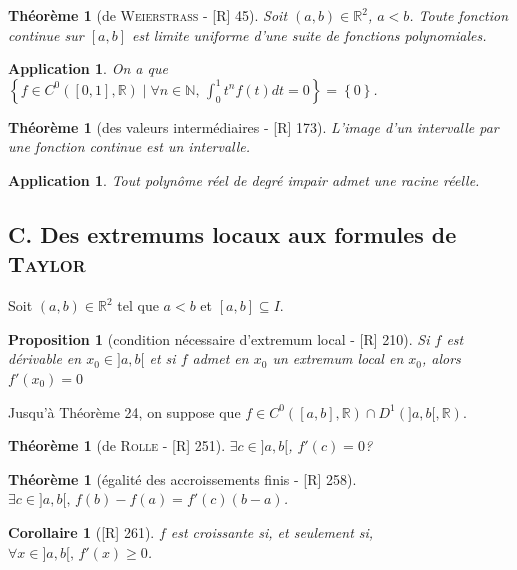 \documentclass[10pt, a4paper, parskip=full, twoside, twocolumn]{report}
\newtheorem{theorem}[definition]{Théorème}
\newtheorem{proposition}[definition]{Proposition}
\newtheorem{corollary}[definition]{Corollaire}
\newtheorem{application}[definition]{Application}
\newcommand{\IN}{\mathbb{N}}
\newcommand{\IR}{\mathbb{R}}
\begin{document}
\begin{theorem}[de \textsc{Weierstrass} - \textnormal{[R] 45}]
	Soit $(a,b)\in \IR^2$, $a<b$. Toute fonction continue sur $[a,b]$ est limite uniforme d'une suite de fonctions polynomiales.
\end{theorem}

\begin{application}
	On a que $\left\{f\in C^0([0,1],\IR)\mid \forall n\in \IN,\, \int_{0}^{1} t^nf(t)dt = 0 \right\} = \left\{0\right\}$.
\end{application}

\begin{theorem}[des valeurs intermédiaires - \textnormal{[R] 173}]
	L'image d'un intervalle par une fonction continue est un intervalle.
\end{theorem}

\begin{application}
	Tout polynôme réel de degré impair admet une racine réelle.
\end{application}

\subsection*{C. Des extremums locaux aux formules de \textsc{Taylor}}

\textcolor{paragraphtext}{Soit $(a,b)\in\IR^2$ tel que $a<b$ et $[a,b]\subseteq I$.}

\begin{proposition}[condition nécessaire d'extremum local - \textnormal{[R] 210}]
	Si $f$ est dérivable en $x_0\in ]a,b[$ et si $f$ admet en $x_0$ un extremum local en $x_0$, alors $f'(x_0) = 0$
\end{proposition}

\textcolor{paragraphtext}{Jusqu'à Théorème 24, on suppose que $f\in C^0([a,b],\IR) \cap D^1(]a,b[,\IR)$.}

\begin{theorem}[de \textsc{Rolle} - \textnormal{[R] 251}]
	$\exists c\in ]a,b[$, $f'(c) = 0$?
\end{theorem}

\begin{theorem}[égalité des accroissements finis - \textnormal{[R] 258}]
	$\exists c\in ]a,b[,\, f(b)-f(a) = f'(c)(b-a)$.
\end{theorem}

\begin{corollary}[\textnormal{[R] 261}]
	$f$ est croissante si, et seulement si, $\forall x\in ]a,b[,\, f'(x) \geq 0$.
\end{corollary}
\end{document}
